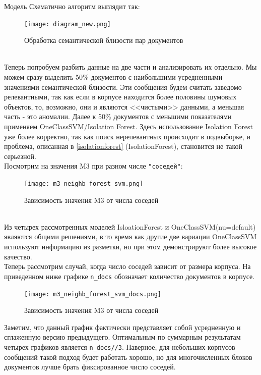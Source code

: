 \documentclass{article}
\begin{document}
\begin{section}{Модель}
Схематично алгоритм выглядит так:
\newpage
\begin{figure}[!htb]
    \center
        \texttt{[image: diagram\_new.png]}
        \caption{Обработка семантической близости пар документов}
\end{figure}\\

Теперь попробуем разбить данные на две части и анализировать их отдельно. Мы можем сразу выделить 50\% документов с наибольшими усредненными значениями семантической близости. Эти сообщения будем считать заведомо релевантными, так как если в корпусе находится более половины шумовых объектов, то, возможно, они и являются <<чистыми>> данными, а меньшая часть - это аномалии. Далее к 50\%  документов с меньшими показателями применяем OneClassSVM/Isolation Forest. Здесь использование Isolation Forest уже более корректно, так как поиск нерелевантных происходит в подвыборке, и проблема, описанная в \textcolor{cyan}{\ref{isolationforest}} (IsolationForest), становится не такой серьезной.\\

Посмотрим на значения M3 при разном числе \verb|"соседей"|:
\begin{figure}[!htb]
    \center
        \texttt{[image: m3\_neighb\_forest\_svm.png]}
        \caption{Зависимость значения M3 от числа соседей}
\end{figure}\\

Из четырех рассмотренных моделей IsloationForest и OneClassSVM(nu=default) являются общими решениями, в то время как другие две вариации OneClassSVM используют информацию из разметки, но при этом демонстрируют более высокое качество.\\

Теперь рассмотрим случай, когда число соседей зависит от размера корпуса. На приведенном ниже графике \verb|n_docs| обозначает количество документов в корпусе.
\newpage
\begin{figure}[!htb]
    \center
        \texttt{[image: m3\_neighb\_forest\_svm\_docs.png]}
        \caption{Зависимость значения M3 от числа соседей}
\end{figure}

Заметим, что данный график фактически представляет собой усредненную и сглаженную версию предыдущего. Оптимальным по суммарным результатам четырех графиков является \verb|n_docs//3|. Наверное, для небольших корпусов сообщений такой подход будет работать хорошо, но для многочисленных блоков документов лучше брать фиксированное число соседей.


\end{section}
\end{document}
